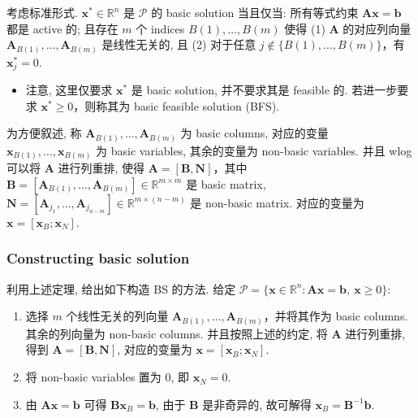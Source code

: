 \begin{thmblock}
考虑标准形式. $\bm{x}^* \in \mathbb{R}^n$ 是 $\mathcal{P}$ 的 basic solution 当且仅当: 所有等式约束 $\bm{A}\bm{x} = \bm{b}$ 都是 active 的; 且存在 $m$ 个 indices $B(1), \dots, B(m)$ 使得 (1) $\bm{A}$ 的对应列向量 $\bm{A}_{B(1)}, \dots, \bm{A}_{B(m)}$ 是线性无关的, 且 (2) 对于任意 $j \notin \{B(1), \dots, B(m)\}$，有 $\bm{x}^*_j = 0$.

\begin{itemize}
\item {}注意, 这里仅要求 $\bm{x}^*$ 是 basic solution, 并不要求其是 feasible 的. 若进一步要求 $\bm{x}^* \geq 0$，则称其为 basic feasible solution (BFS).


\end{itemize}

\end{thmblock}


\begin{defblock}
为方便叙述, 称 $\bm{A}_{B(1)}, \dots, \bm{A}_{B(m)}$ 为 basic columns, 对应的变量 $\bm{x}_{B(1)}, \dots, \bm{x}_{B(m)}$ 为 basic variables, 其余的变量为 non-basic variables. 并且 wlog 可以将 $\bm{A}$ 进行列重排, 使得 $\bm{A} = [\bm{B}, \bm{N}]$，其中 $\bm{B} = [\bm{A}_{B(1)}, \dots, \bm{A}_{B(m)}] \in \mathbb{R}^{m \times m}$ 是 basic matrix, $\bm{N} = [\bm{A}_{j_1}, \dots, \bm{A}_{j_{n-m}}] \in \mathbb{R}^{m \times (n-m)}$ 是 non-basic matrix. 对应的变量为 $\bm{x} = [\bm{x}_B; \bm{x}_N]$.

\end{defblock}

\subsubsection{Constructing basic solution}

利用上述定理, 给出如下构造 BS 的方法. 给定 $\mathcal{P} = \{\bm{x} \in \mathbb{R}^n: \bm{A}\bm{x} = \bm{b},~ \bm{x} \geq 0\}$:

\begin{enumerate}
\item {}选择 $m$ 个线性无关的列向量 $\bm{A}_{B(1)}, \dots, \bm{A}_{B(m)}$，并将其作为 basic columns. 其余的列向量为 non-basic columns. 并且按照上述的约定, 将 $\bm{A}$ 进行列重排, 得到 $\bm{A} = [\bm{B}, \bm{N}]$, 对应的变量为 $\bm{x} = [\bm{x}_B; \bm{x}_N]$.


\item {}将 non-basic variables 置为 $0$, 即 $\bm{x}_N = 0$.


\item {}由 $\bm{A}\bm{x} = \bm{b}$ 可得 $\bm{B}\bm{x}_B = \bm{b}$, 由于 $\bm{B}$ 是非奇异的, 故可解得 $\bm{x}_B = \bm{B}^{-1}\bm{b}$.


\end{enumerate}

